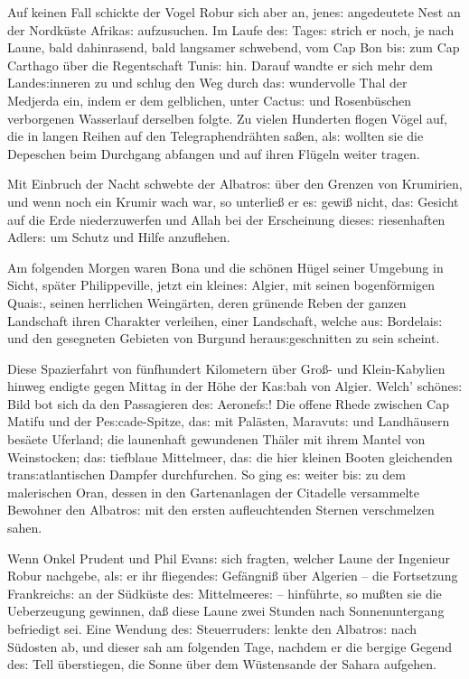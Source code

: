 \documentclass[oneside,12pt]{book}
\newcommand{\s}{s:}
\begin{document}
Auf keinen Fall schickte der Vogel Robur sich aber an, jene{\s}
angedeutete Nest an der Nordk\"uste Afrika{\s} aufzusuchen. Im Laufe
de{\s} Tage{\s} strich er noch, je nach Laune, bald dahinrasend, bald
langsamer schwebend, vom Cap Bon bi{\s} zum Cap Carthago \"uber die
Regentschaft Tuni{\s} hin. Darauf wandte er sich mehr dem
Lande{\s}inneren zu und schlug den Weg durch da{\s} wundervolle Thal
der Medjerda ein, indem er dem gelblichen, unter Cactu{\s} und
Rosenb\"uschen verborgenen Wasserlauf derselben folgte. Zu vielen
Hunderten flogen V\"ogel auf, die in langen Reihen auf den
Telegraphendr\"ahten sa{\ss}en, al{\s} wollten sie die Depeschen beim
Durchgang abfangen und auf ihren Fl\"ugeln weiter tragen.

Mit Einbruch der Nacht schwebte der {\glqq}Albatro{\s}{\grqq} \"uber
den Grenzen von Krumirien, und wenn noch ein Krumir wach war, so
unterlie{\ss} er e{\s} gewi{\ss} nicht, da{\s} Gesicht auf die Erde
niederzuwerfen und Allah bei der Erscheinung diese{\s} riesenhaften
Adler{\s} um Schutz und Hilfe anzuflehen.

Am folgenden Morgen waren Bona und die sch\"onen H\"ugel seiner
Umgebung in Sicht, sp\"ater Philippeville, jetzt ein kleine{\s}
Algier, mit seinen bogenf\"ormigen Quai{\s}, seinen herrlichen
Weing\"arten, deren gr\"unende Reben der ganzen Landschaft ihren
Charakter verleihen, einer Landschaft, welche au{\s} Bordelai{\s} und
den gesegneten Gebieten von Burgund herau{\s}geschnitten zu sein
scheint.

Diese Spazierfahrt von f\"unfhundert Kilometern \"uber Gro{\ss}- und
Klein-Kabylien hinweg endigte gegen Mittag in der H\"ohe der
Ka{\s}bah von Algier. Welch' sch\"one{\s} Bild bot sich da den
Passagieren de{\s} Aeronef{\s}! Die offene Rhede zwischen Cap Matifu
und der Pe{\s}cade-Spitze, da{\s} mit Pal\"asten, Maravut{\s} und
Landh\"ausern bes\"aete Uferland; die launenhaft gewundenen Th\"aler
mit ihrem Mantel von Weinstocken; da{\s} tiefblaue Mittelmeer, da{\s}
die hier kleinen Booten gleichenden tran{\s}atlantischen Dampfer
durchfurchen. So ging e{\s} weiter bi{\s} zu dem malerischen Oran,
dessen in den Gartenanlagen der Citadelle versammelte Bewohner den
{\glqq}Albatro{\s}{\grqq} mit den ersten aufleuchtenden Sternen
verschmelzen sahen.

Wenn Onkel Prudent und Phil Evan{\s} sich fragten, welcher Laune der
Ingenieur Robur nachgebe, al{\s} er ihr fliegende{\s} Gef\"angni{\ss}
\"uber Algerien -- die Fortsetzung Frankreich{\s} an der S\"udk\"uste
de{\s} Mittelmeere{\s} -- hinf\"uhrte, so mu{\ss}ten sie die
Ueberzeugung gewinnen, da{\ss} diese Laune zwei Stunden nach
Sonnenuntergang befriedigt sei. Eine Wendung de{\s} Steuerruder{\s}
lenkte den {\glqq}Albatro{\s}{\grqq} nach S\"udosten ab, und dieser
sah am folgenden Tage, nachdem er die bergige Gegend de{\s} Tell
\"uberstiegen, die Sonne \"uber dem W\"ustensande der Sahara
aufgehen.
\end{document}
